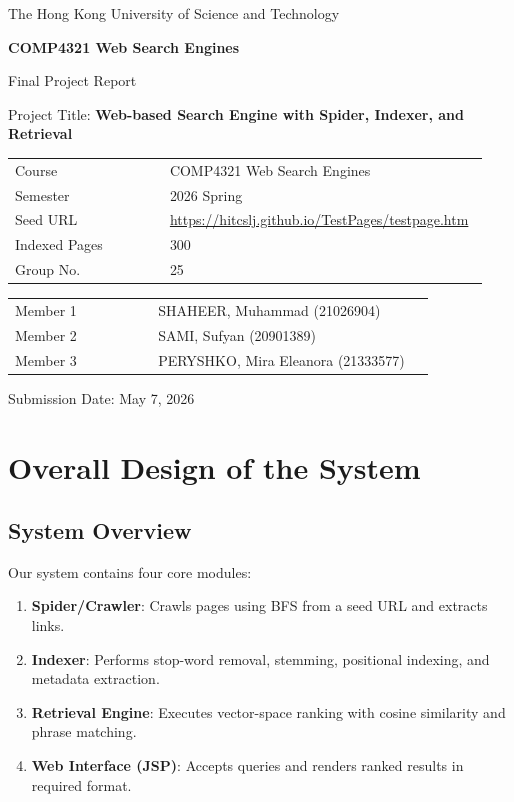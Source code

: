 \documentclass[11pt,a4paper]{article}
\begin{document}
\begin{titlepage}
  \centering
  {\Large The Hong Kong University of Science and Technology\par}
  \vspace{1.2cm}
  {\LARGE \textbf{COMP4321 Web Search Engines}\par}
  \vspace{0.5cm}
  {\Large Final Project Report\par}
  \vspace{1.5cm}

  {\large Project Title: \textbf{Web-based Search Engine with Spider, Indexer, and Retrieval}\par}
  \vspace{1.0cm}

  \begin{tabular}{>{\raggedright\arraybackslash}p{0.32\linewidth}p{0.62\linewidth}}
    Course & COMP4321 Web Search Engines \\
    Semester & 2026 Spring \\
    Seed URL & \url{https://hitcslj.github.io/TestPages/testpage.htm} \\
    Indexed Pages & 300 \\
    Group No. & 25 \\
  \end{tabular}

  \vfill

  \begin{tabular}{>{\raggedright\arraybackslash}p{0.32\linewidth}p{0.62\linewidth}}
    Member 1 & SHAHEER, Muhammad (21026904) \\
    Member 2 & SAMI, Sufyan (20901389) \\
    Member 3 & PERYSHKO, Mira Eleanora (21333577) \\
  \end{tabular}

  \vfill
  {\large Submission Date: May 7, 2026\par}
\end{titlepage}

\section{Overall Design of the System}

\subsection{System Overview}
Our system contains four core modules:
\begin{enumerate}[leftmargin=1.5em]
  \item \textbf{Spider/Crawler}: Crawls pages using BFS from a seed URL and extracts links.
  \item \textbf{Indexer}: Performs stop-word removal, stemming, positional indexing, and metadata extraction.
  \item \textbf{Retrieval Engine}: Executes vector-space ranking with cosine similarity and phrase matching.
  \item \textbf{Web Interface (JSP)}: Accepts queries and renders ranked results in required format.
\end{enumerate}
\end{document}
